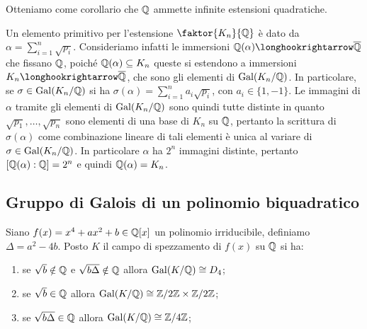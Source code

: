\documentclass[11pt]{scrartcl}
\begin{document}
	\begin{remark}
		Otteniamo come corollario che $\mathbb Q$ ammette infinite estensioni quadratiche.
	\end{remark}
	
	\begin{remark}
		Un elemento primitivo per l'estensione $\faktor{K_n}{\QQ}$ è dato da 
		$\alpha =\displaystyle \sum_{i = 1}^n \sqrt{p_i}$. Consideriamo infatti le immersioni
		$\QQ(\alpha) \longhookrightarrow \ol{\QQ}$ che fissano $\mathbb Q$, poiché 
		$\mathbb Q(\alpha) \subseteq K_n$ queste si estendono a immersioni
		$K_n \longhookrightarrow \ol{\QQ}$, che sono gli elementi di $\operatorname{Gal}(K_n/\mathbb Q)$.
		In particolare, se $\sigma \in \operatorname{Gal}(K_n/\mathbb Q)$ si ha 
		$\sigma(\alpha) = \displaystyle\sum_{i = 1}^n a_i\sqrt{p_i}$, con $a_i \in \{1, -1\}$.
		Le immagini di $\alpha$ tramite gli elementi di $\operatorname{Gal}(K_n/\mathbb Q)$ sono 
		quindi tutte distinte in quanto $\sqrt{p_1}, \ldots, \sqrt{p_n}$ sono
		elementi di una base di $K_n$ su $\mathbb Q$, pertanto la scrittura di $\sigma(\alpha)$
		come combinazione lineare di tali elementi è unica al variare di 
		$\sigma \in \operatorname{Gal}(K_n/\mathbb Q)$. In particolare $\alpha$ ha $2^n$ immagini distinte,
		pertanto $[\mathbb Q(\alpha): \mathbb Q] = 2^n$ e quindi $\mathbb Q(\alpha) = K_n$.
	\end{remark}
	
	\newpage
	
	\subsection{Gruppo di Galois di un polinomio biquadratico}
	
	\begin{theorem}
		Siano $f(x) = x^4 + ax^2 + b \in \mathbb Q[x]$ un polinomio irriducibile, definiamo $\Delta = a^2 - 4b$.
		Posto $K$ il campo di spezzamento di $f(x)$ su $\mathbb Q$ si ha:
		\begin{enumerate}[(1)]
			\item se $\sqrt{b} \notin \mathbb Q$ e $\sqrt{b\Delta} \notin \mathbb Q$ allora $\operatorname{Gal}(K/\mathbb Q) \cong D_4$;
			\item se $\sqrt{b} \in \mathbb Q$ allora $\operatorname{Gal}(K/\mathbb Q) \cong \mathbb{Z}/{2}\mathbb{Z}\times\mathbb{Z}/{2}\mathbb{Z}$;
			\item se $\sqrt{b\Delta}\in\mathbb Q$ allora $\operatorname{Gal}(K/\mathbb Q) \cong \mathbb{Z}/{4}\mathbb{Z}$;
		\end{enumerate}
	\end{theorem}
	
\end{document}
